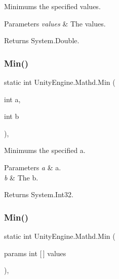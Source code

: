 Minimums the specified values. 


\begin{DoxyParams}{Parameters}
{\em values} & The values.\\
\hline
\end{DoxyParams}
\begin{DoxyReturn}{Returns}
System.\+Double.
\end{DoxyReturn}
\mbox{\label{struct_unity_engine_1_1_mathd_ac366d9fa5c7afe37c96e6933cdbd90ed}} 
\subsubsection{\texorpdfstring{Min()}{Min()}\hspace{0.1cm}{\footnotesize\ttfamily [3/4]}}
{\footnotesize\ttfamily static int Unity\+Engine.\+Mathd.\+Min (\begin{DoxyParamCaption}\item[{int}]{a,  }\item[{int}]{b }\end{DoxyParamCaption})\hspace{0.3cm}{\ttfamily [inline]}, {\ttfamily [static]}}



Minimums the specified a. 


\begin{DoxyParams}{Parameters}
{\em a} & a.\\
\hline
{\em b} & The b.\\
\hline
\end{DoxyParams}
\begin{DoxyReturn}{Returns}
System.\+Int32.
\end{DoxyReturn}
\mbox{\label{struct_unity_engine_1_1_mathd_a7b927fa42f53f8ef0761e5c7d6e3e648}} 
\subsubsection{\texorpdfstring{Min()}{Min()}\hspace{0.1cm}{\footnotesize\ttfamily [4/4]}}
{\footnotesize\ttfamily static int Unity\+Engine.\+Mathd.\+Min (\begin{DoxyParamCaption}\item[{params int \mbox{[}$\,$\mbox{]}}]{values }\end{DoxyParamCaption})\hspace{0.3cm}{\ttfamily [inline]}, {\ttfamily [static]}}



